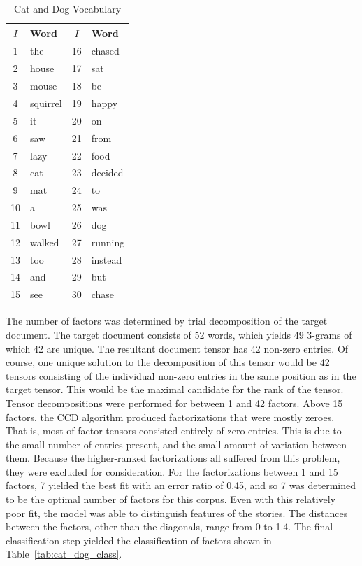 \documentclass[../ut-dissertation.tex]{subfiles}
\begin{document}
\begin{table}[p]
  \centering
  \caption{Cat and Dog Vocabulary}\label{tab:catdog_vocabulary}
  \begin{tabular}{|c|l||c|l|}
    \hline
    $I$ & Word & $I$ & Word\\ 
    \hline
    1 & the & 16 & chased \\
    2 & house & 17 & sat \\
    3 & mouse & 18 & be \\
    4 & squirrel & 19 & happy \\
    5 & it & 20 & on\\
    6 & saw & 21 & from \\
    7 & lazy & 22 & food \\
    8 & cat & 23 & decided \\
    9 & mat & 24 & to\\
   10 & a & 25 & was \\
   11 & bowl & 26 & dog \\
   12 & walked & 27 & running \\
   13 & too & 28 & instead \\
   14 & and & 29 & but \\
   15 & see & 30 & chase\\
    \hline
  \end{tabular}
\end{table}
\FloatBarrier

The number of factors was determined by trial decomposition of the
target document.  The target document consists of 52 words, which
yields 49 3-grams of which 42 are unique.  The resultant document
tensor has 42 non-zero entries.  Of course, one unique solution to the
decomposition of this tensor would be 42 tensors consisting of the
individual non-zero entries in the same position as in the target
tensor.  This would be the maximal candidate for the rank of the
tensor.  Tensor decompositions were performed for between 1 and 42
factors.  Above 15 factors, the CCD algorithm produced factorizations
that were mostly zeroes.  That is, most of factor tensors consisted
entirely of zero entries.  This is due to the small number of entries
present, and the small amount of variation between them.  Because the
higher-ranked factorizations all suffered from this problem, they were
excluded for consideration.  For the factorizations between 1 and 15
factors, 7 yielded the best fit with an error ratio of 0.45, and so 7
was determined to be the optimal number of factors for this
corpus. Even with this relatively poor fit, the model was able to
distinguish features of the stories.  The distances between the
factors, other than the diagonals, range from 0 to 1.4.  The final
classification step yielded the classification of factors shown in
Table~\ref{tab:cat_dog_class}.
\end{document}
